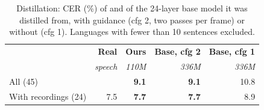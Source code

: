 \begin{table}[t]
\centering
\footnotesize
\setlength{\tabcolsep}{3.5pt}
\begin{tabular}{lrrrr}
\toprule
 & \textbf{Real} & \textbf{Ours} & \textbf{Base, cfg 2} & \textbf{Base, cfg 1} \\
 & \textit{speech} & \textit{110M} & \textit{336M} & \textit{336M} \\
\midrule
All (45) & & \textbf{9.1} & \textbf{9.1} & 10.8 \\
With recordings (24) & 7.5 & \textbf{7.7} & \textbf{7.7} & 8.9 \\
\bottomrule
\end{tabular}
\caption{Distillation: CER (\%) of \att{} and of the 24-layer base model it was distilled from, with guidance (cfg 2, two passes per frame) or without (cfg 1). Languages with fewer than 10 sentences excluded.}
\label{tab:distill}
\end{table}
